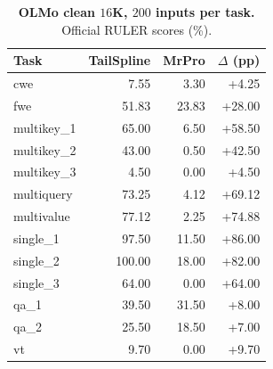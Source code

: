 \begin{table}[ht]
\centering\small
\caption{\textbf{OLMo clean $16$K, $200$ inputs per task.} Official RULER scores (\%).}
\label{tab:olmo-clean-new}
\begin{tabular}{@{}lrrr@{}}
\toprule
Task & TailSpline & MrPro & $\Delta$ (pp) \\
\midrule
cwe & 7.55 & 3.30 & +4.25 \\
fwe & 51.83 & 23.83 & +28.00 \\
multikey\_1 & 65.00 & 6.50 & +58.50 \\
multikey\_2 & 43.00 & 0.50 & +42.50 \\
multikey\_3 & 4.50 & 0.00 & +4.50 \\
multiquery & 73.25 & 4.12 & +69.12 \\
multivalue & 77.12 & 2.25 & +74.88 \\
single\_1 & 97.50 & 11.50 & +86.00 \\
single\_2 & 100.00 & 18.00 & +82.00 \\
single\_3 & 64.00 & 0.00 & +64.00 \\
qa\_1 & 39.50 & 31.50 & +8.00 \\
qa\_2 & 25.50 & 18.50 & +7.00 \\
vt & 9.70 & 0.00 & +9.70 \\
\bottomrule
\end{tabular}
\end{table}
